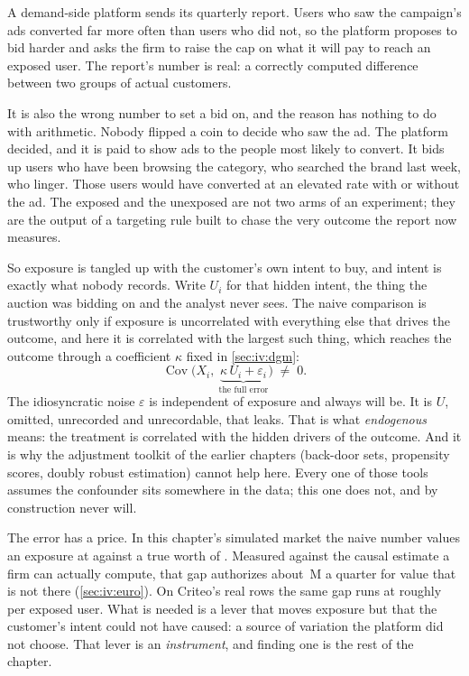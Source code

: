 A demand-side platform sends its quarterly report. Users who saw the campaign's ads converted far
more often than users who did not, so the platform proposes to bid harder and asks the firm to
raise the cap on what it will pay to reach an exposed user. The report's number is real: a
correctly computed difference between two groups of actual customers.

It is also the wrong number to set a bid on, and the reason has nothing to do with arithmetic.
Nobody flipped a coin to decide who saw the ad. The platform decided, and it is paid to show ads
to the people most likely to convert. It bids up users who have been browsing the category, who
searched the brand last week, who linger. Those users would have converted at an elevated rate with
or without the ad. The exposed and the unexposed are not two arms of an experiment; they are the
output of a targeting rule built to chase the very outcome the report now measures.

So exposure is tangled up with the customer's own intent to buy, and intent is exactly what
nobody records. Write $U_i$ for that hidden intent, the thing the auction was bidding on and the
analyst never sees. The naive comparison is trustworthy only if exposure is uncorrelated with
everything else that drives the outcome, and here it is correlated with the largest such thing,
which reaches the outcome through a coefficient $\kappa$ fixed in \cref{sec:iv:dgm}:
%
\begin{equation}
  \operatorname{Cov}\big(X_i,\ \underbrace{\kappa\,U_i + \varepsilon_i}_{\text{the full error}}\big)
  \;\neq\; 0 .
  \label{eq:iv:endog}
\end{equation}
%
The idiosyncratic noise $\varepsilon$ is independent of exposure and always will be. It is $U$,
omitted, unrecorded and unrecordable, that leaks. That is what \emph{endogenous} means: the
treatment is correlated with the hidden drivers of the outcome. And it is why the adjustment toolkit
of the earlier chapters (back-door sets, propensity scores, doubly robust estimation) cannot
help here. Every one of those tools assumes the confounder sits somewhere in the data; this one does
not, and by construction never will.

The error has a price. In this chapter's simulated market the naive number values an exposure at
\eur{\nbElevenNaive} against a true worth of \eur{\nbElevenTrue}. Measured against the causal
estimate a firm can actually compute, that gap authorizes about \eur{\nbElevenOverpayM}\,M a quarter
for value that is not there (\cref{sec:iv:euro}). On Criteo's real rows the same gap runs at roughly
\eur{\nbElevenBPremium} per exposed user. What is needed is a lever that moves exposure but that the
customer's intent could not have caused: a source of variation the platform did not choose. That
lever is an \emph{instrument}, and finding one is the rest of the chapter.

